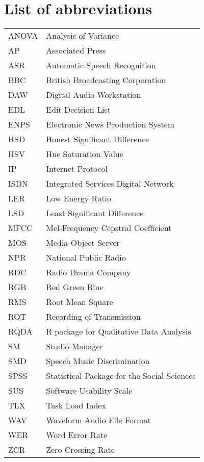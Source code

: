 \chapter*{List of abbreviations}

\begin{tabular}{l l}
ANOVA & Analysis of Variance \\
AP & Associated Press \\
ASR & Automatic Speech Recognition \\
BBC & British Broadcasting Corporation \\
DAW & Digital Audio Workstation \\
EDL & Edit Decision List \\
ENPS & Electronic News Production System \\
HSD & Honest Significant Difference \\
HSV & Hue Saturation Value \\
IP & Internet Protocol \\
ISDN & Integrated Services Digital Network \\
LER & Low Energy Ratio \\
LSD & Least Significant Difference \\
MFCC & Mel-Frequency Cepstral Coefficient \\
MOS & Media Object Server \\
NPR & National Public Radio \\
RDC & Radio Drama Company \\
RGB & Red Green Blue \\
RMS & Root Mean Square \\
ROT & Recording of Transmission \\
RQDA & R package for Qualitative Data Analysis \\
SM  & Studio Manager \\
SMD & Speech Music Discrimination \\
SPSS & Statistical Package for the Social Sciences \\
SUS & Software Usability Scale \\
TLX & Task Load Index \\
WAV & Waveform Audio File Format \\
WER & Word Error Rate \\
ZCR & Zero Crossing Rate
\end{tabular}
